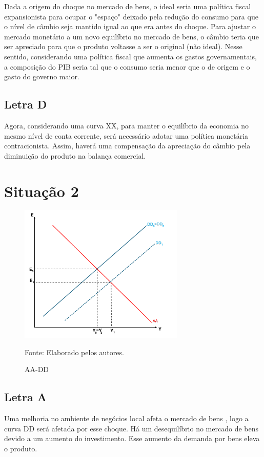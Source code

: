 \documentclass[a4paper,12pt]{article}[abntex2]
\begin{document}
Dada a origem do choque no mercado de bens, o ideal seria uma política fiscal expansionista para ocupar o "espaço" deixado pela redução do consumo para que o nível de câmbio seja mantido igual ao que era antes do choque. Para ajustar o mercado monetário a um novo equilíbrio no mercado de bens, o câmbio teria que ser apreciado para que o produto voltasse a ser o original (não ideal).
Nesse sentido, considerando uma política fiscal que aumenta os gastos governamentais, a composição do PIB seria tal que o consumo seria menor que o de origem e o gasto do governo maior.

\subsection{\textbf{Letra D}}

Agora, considerando uma curva XX, para manter o equilíbrio da economia no mesmo nível de conta corrente, será necessário adotar uma política monetária contracionista. Assim, haverá uma compensação da apreciação do câmbio pela diminuição do produto na balança comercial.

\section{\textbf{Situação 2}}
\begin{figure}[H]
    \centering
    \caption{AA-DD} 
    \includegraphics[width=0.7\textwidth]{4º Período/Macroeconomia Internacional/APS 4 Macro Int/AA-DD L(b).png}
    \label{fig:AADD Lb}
    
    \footnotesize{Fonte: Elaborado pelos autores.}
    \end{figure}
    


\subsection{\textbf{Letra A}}
Uma melhoria no ambiente de negócios local afeta o mercado de bens , logo a curva DD será afetada por esse choque. Há um desequilíbrio no mercado de bens devido a um aumento do investimento. Esse aumento da demanda por bens eleva o produto.
\end{document}
